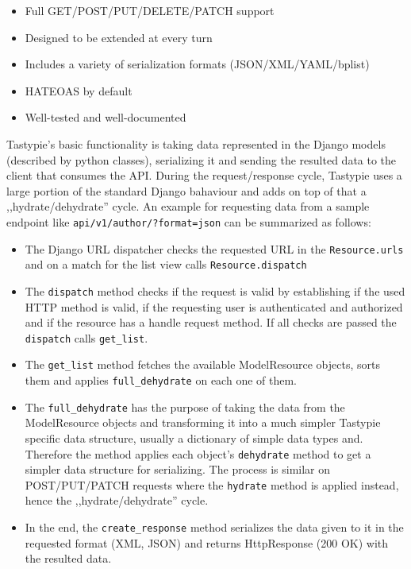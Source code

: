 \begin{itemize}
	\item Full GET/POST/PUT/DELETE/PATCH support
	\item Designed to be extended at every turn
	\item Includes a variety of serialization formats (JSON/XML/YAML/bplist)
	\item HATEOAS by default
	\item Well-tested and well-documented
\end{itemize}

Tastypie's basic functionality is taking data represented in the Django models (described by python classes), serializing it and sending the resulted data to the client that consumes the API. During the request/response cycle, Tastypie uses a large portion of the standard Django bahaviour and adds on top of that a ,,hydrate/dehydrate'' cycle. An example for requesting data from a sample endpoint like \texttt{api/v1/author/?format=json} can be summarized as follows:

\begin{itemize}
	\item The Django URL dispatcher checks the requested URL in the \texttt{Resource.urls} and on a match for the list view calls \texttt{Resource.dispatch}
	\item The \texttt{dispatch} method checks if the request is valid by establishing if the used HTTP method is valid, if the requesting user is authenticated and authorized and if the resource has a handle  request method. If all checks are passed the \texttt{dispatch} calls \texttt{get\_list}.
	\item The \texttt{get\_list} method fetches the available ModelResource objects, sorts them and applies \texttt{full\_dehydrate} on each one of them.
	\item The \texttt{full\_dehydrate} has the purpose of taking the data from the ModelResource objects and transforming it into a much simpler Tastypie specific data structure, usually a dictionary of simple data types and. Therefore the method applies each object's  \texttt{dehydrate} method to get a simpler data structure for serializing. The process is similar on  POST/PUT/PATCH requests where the \texttt{hydrate} method is applied instead, hence the ,,hydrate/dehydrate'' cycle.
	\item In the end, the \texttt{create\_response} method serializes the data given to it in the requested format (XML, JSON) and returns HttpResponse (200 OK) with the resulted data.
\end{itemize}

